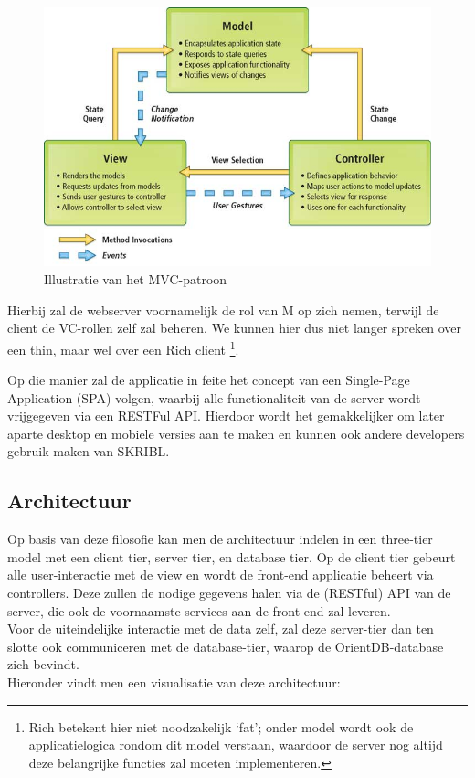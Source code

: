 \documentclass{article}
\begin{document}
\begin{figure}[!h]
\centering
 \includegraphics[width=130mm]{MVC.jpg}
 \caption{Illustratie van het MVC-patroon}
 \label{Model-View-Controller}
\end{figure}

\thispagestyle{fancy}
Hierbij zal de webserver voornamelijk de rol van M op zich nemen, terwijl de client de VC-rollen zelf zal beheren. We kunnen hier dus niet langer spreken over een thin, maar wel over een Rich client \footnote{Rich betekent hier niet noodzakelijk `fat'; onder model wordt ook de applicatielogica rondom dit model verstaan, waardoor de server nog altijd deze belangrijke functies zal moeten implementeren.}. 

Op die manier zal de applicatie in feite het concept van een Single-Page Application (SPA) volgen, waarbij alle functionaliteit van de server wordt vrijgegeven via een RESTFul API. Hierdoor wordt het gemakkelijker om later aparte desktop en mobiele versies aan te maken en kunnen ook andere developers gebruik maken van SKRIBL.

\subsection{Architectuur}

Op basis van deze filosofie kan men de architectuur indelen in een three-tier model met een client tier, server tier, en database tier. Op de client tier gebeurt alle user-interactie met de view en wordt de front-end applicatie beheert via controllers. Deze zullen de nodige gegevens halen via de (RESTful) API van de server, die ook de voornaamste services aan de front-end zal leveren. \\ 
Voor de uiteindelijke interactie met de data zelf, zal deze server-tier dan ten slotte ook communiceren met de database-tier, waarop de OrientDB-database zich bevindt. \\
Hieronder vindt men een visualisatie van deze architectuur:
\end{document}
